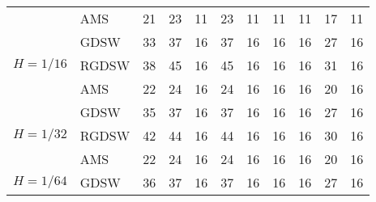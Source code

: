 \begin{table}[H]
\begin{tabular}{llrrrrrrrrr}
\cline{2-11}
\bfseries  & AMS & 21 & {\cellcolor[HTML]{405FE5}} \color[HTML]{F1F1F1} 23 & 11 & {\cellcolor[HTML]{405FE5}} \color[HTML]{F1F1F1} 23 & 11 & {\cellcolor[HTML]{E2E4FB}} \color[HTML]{000000} 11 & 11 & {\cellcolor[HTML]{91A1F0}} \color[HTML]{F1F1F1} 17 & 11 \\
\cline{1-11} \cline{2-11}
\multirow[c]{3}{*}{\bfseries $H=1/16$} & GDSW & 33 & {\cellcolor[HTML]{405FE5}} \color[HTML]{F1F1F1} 37 & 16 & {\cellcolor[HTML]{405FE5}} \color[HTML]{F1F1F1} 37 & 16 & {\cellcolor[HTML]{E2E4FB}} \color[HTML]{000000} 16 & 16 & {\cellcolor[HTML]{91A1F0}} \color[HTML]{F1F1F1} 27 & 16 \\
\cline{2-11}
\bfseries  & RGDSW & 38 & {\cellcolor[HTML]{405FE5}} \color[HTML]{F1F1F1} 45 & 16 & {\cellcolor[HTML]{405FE5}} \color[HTML]{F1F1F1} 45 & 16 & {\cellcolor[HTML]{E2E4FB}} \color[HTML]{000000} 16 & 16 & {\cellcolor[HTML]{405FE5}} \color[HTML]{F1F1F1} 31 & 16 \\
\cline{2-11}
\bfseries  & AMS & 22 & {\cellcolor[HTML]{405FE5}} \color[HTML]{F1F1F1} 24 & 16 & {\cellcolor[HTML]{405FE5}} \color[HTML]{F1F1F1} 24 & 16 & {\cellcolor[HTML]{E2E4FB}} \color[HTML]{000000} 16 & 16 & {\cellcolor[HTML]{405FE5}} \color[HTML]{F1F1F1} 20 & 16 \\
\cline{1-11} \cline{2-11}
\multirow[c]{3}{*}{\bfseries $H=1/32$} & GDSW & 35 & {\cellcolor[HTML]{405FE5}} \color[HTML]{F1F1F1} 37 & 16 & {\cellcolor[HTML]{405FE5}} \color[HTML]{F1F1F1} 37 & 16 & {\cellcolor[HTML]{E2E4FB}} \color[HTML]{000000} 16 & 16 & {\cellcolor[HTML]{91A1F0}} \color[HTML]{F1F1F1} 27 & 16 \\
\cline{2-11}
\bfseries  & RGDSW & 42 & {\cellcolor[HTML]{405FE5}} \color[HTML]{F1F1F1} 44 & 16 & {\cellcolor[HTML]{405FE5}} \color[HTML]{F1F1F1} 44 & 16 & {\cellcolor[HTML]{E2E4FB}} \color[HTML]{000000} 16 & 16 & {\cellcolor[HTML]{91A1F0}} \color[HTML]{F1F1F1} 30 & 16 \\
\cline{2-11}
\bfseries  & AMS & 22 & {\cellcolor[HTML]{405FE5}} \color[HTML]{F1F1F1} 24 & 16 & {\cellcolor[HTML]{405FE5}} \color[HTML]{F1F1F1} 24 & 16 & {\cellcolor[HTML]{E2E4FB}} \color[HTML]{000000} 16 & 16 & {\cellcolor[HTML]{405FE5}} \color[HTML]{F1F1F1} 20 & 16 \\
\cline{1-11} \cline{2-11}
\multirow[c]{3}{*}{\bfseries $H=1/64$} & GDSW & 36 & {\cellcolor[HTML]{405FE5}} \color[HTML]{F1F1F1} 37 & 16 & {\cellcolor[HTML]{405FE5}} \color[HTML]{F1F1F1} 37 & 16 & {\cellcolor[HTML]{E2E4FB}} \color[HTML]{000000} 16 & 16 & {\cellcolor[HTML]{91A1F0}} \color[HTML]{F1F1F1} 27 & 16 \\

\end{tabular}
\end{table}
